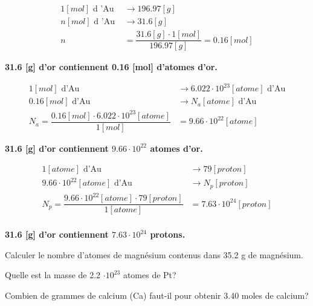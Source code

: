 \documentclass[
  11pt,
  french,
  a4paper,
  openany]{book}
\begin{document}
\begin{Answer}
\[ \begin{split}
    1 [mol] \text{ d 'Au } &\longrightarrow 196.97 [g]\\
    n [mol] \text{ d 'Au } &\longrightarrow 31.6 [g]\\
    n &= \dfrac{31.6 [g] \cdot 1 [mol]}{196.97 [g]} = 0.16 [mol]
\end{split} \]

\textbf{31.6 {[}g{]} d'or contiennent 0.16 {[}mol{]} d'atomes d'or.}

\[ \begin{split}
    1 [mol] \text{ d'Au } &\longrightarrow 6.022\cdot 10^{23} [atome] \text{ d'Au}\\
    0.16 [mol] \text{ d'Au } &\longrightarrow N_a [atome] \text{ d'Au}\\
    N_a = \dfrac{0.16 [mol] \cdot 6.022\cdot 10^{23} [atome]}{1 [mol]} &= 9.66\cdot 10^{22} [atome]
\end{split} \]

\textbf{31.6 {[}g{]} d'or contiennent \(9.66\cdot 10^{22}\) atomes d'or.}

\[ \begin{split}
    1 [atome] \text{ d'Au } &\longrightarrow 79 [proton]\\
    9.66\cdot 10^{22} [atome] \text{ d'Au } &\longrightarrow N_{p} [proton]\\
    N_p = \dfrac{9.66\cdot 10^{22} [atome] \cdot 79 [proton]}{1 [atome]} &= 7.63\cdot 10^{24} [proton]\\
\end{split} \]

\textbf{31.6 {[}g{]} d'or contiennent \(7.63\cdot 10^{24}\) protons.}

\end{Answer}

\newpage

\begin{Exercise}

Calculer le nombre d'atomes de magnésium contenus dans 35.2 g de magnésium.


Quelle est la masse de 2.2 \(\cdot 10^{23}\) atomes de Pt?


Combien de grammes de calcium (Ca) faut-il pour obtenir 3.40 moles de calcium?



\end{Exercise}
\end{document}
